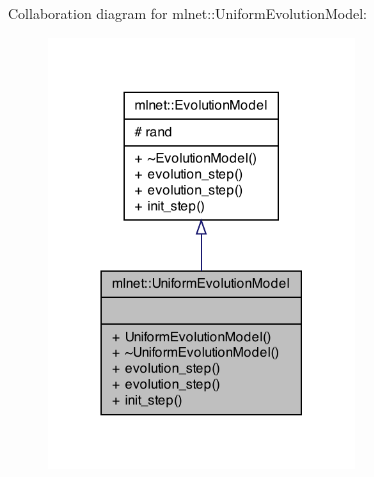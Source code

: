 Collaboration diagram for mlnet\+:\+:Uniform\+Evolution\+Model\+:\nopagebreak
\begin{figure}[H]
\begin{center}
\leavevmode
\includegraphics[width=230pt]{classmlnet_1_1_uniform_evolution_model__coll__graph}
\end{center}
\end{figure}
